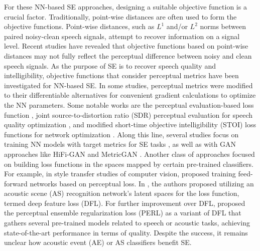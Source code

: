 \documentclass[a4paper]{article}
\begin{document}
For these NN-based SE approaches, designing a suitable objective function is a crucial factor. Traditionally, point-wise distances are often used to form the objective functions. Point-wise distances, such as $L^1$ and/or $L^2$ norms between paired noisy-clean speech signals, attempt to recover information on a signal level. Recent studies have revealed that objective functions based on point-wise distances may not fully reflect the perceptual difference between noisy and clean speech signals. As the purpose of SE is to recover speech quality and intelligibility, objective functions that consider perceptual metrics have been investigated for NN-based SE. In some studies, perceptual metrics were modified to their differentiable alternatives for convenient gradient calculations to optimize the NN parameters. Some notable works are the perceptual evaluation-based loss function \cite{martin2018deep}, joint source-to-distortion ratio (SDR) perceptual evaluation for speech quality optimization \cite{kim2019end}, and modified short-time objective intelligibility (STOI) loss functions for network optimization \cite{fu2018end, kolbaek2018monaural, zhao2018perceptually}. Along this line, several studies focus on training NN models with target metrics for SE tasks \cite{fu2019learning}, as well as with GAN approaches like HiFi-GAN \cite{su2020hifi} and MetricGAN \cite{fu2019metricgan}.
Another class of approaches focused on building loss functions in the spaces mapped by certain pre-trained classifiers. 
For example, in style transfer studies of computer vision, \cite{johnson2016perceptual} proposed training feed-forward networks based on perceptual loss. In \cite{germain2019speech}, the authors proposed utilizing an acoustic scene (AS) recognition network's latent spaces for the loss function, termed deep feature loss (DFL). For further improvement over DFL, \cite{kataria2020perceptual} proposed the perceptual ensemble regularization loss (PERL) as a variant of DFL that gathers several pre-trained models related to speech or acoustic tasks, achieving state-of-the-art performance in terms of quality. Despite the success, it remains unclear how acoustic event (AE) or AS classifiers benefit SE. \par
\end{document}
